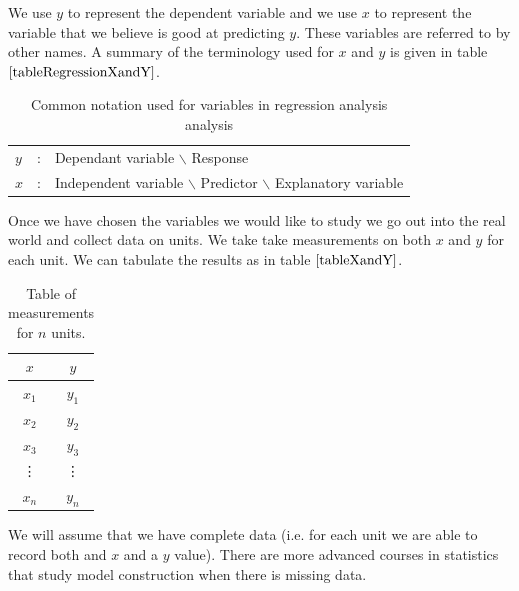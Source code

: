 We use $y$ to represent the dependent variable and we use
$x$ to represent the variable that we believe is good at predicting $y$.
These variables are referred to by other names.
A summary of the terminology used for $x$ and $y$ is given
in table $\ref{tableRegressionXandY}$.

\begin{table}[H]
\label{tableRegressionXandY}
\large
\begin{center}
	\begin{tabular}{l c l}
	$y$	& : &	Dependant variable $\backslash$ Response \\
	$x$	& : &	Independent variable $\backslash$  Predictor $\backslash$ Explanatory variable %
	\end{tabular}
\end{center}
\vspace*{-0.25cm}
\caption{Common notation used for variables in regression analysis analysis}
\end{table}
\hfill

Once we have chosen the variables we would like to study we go out into the 
real world and collect data on units.
We take take measurements on both $x$ and $y$
for each unit.
We can tabulate the results as in table $\ref{tableXandY}$.


\begin{table}[H]
\label{tableXandY}
\large
\begin{center}
\begin{tabular}{c | c }
~$x$~	&	~$y$~		\\
\hline
$x_{1}$	&	$y_{1}$	\\
$x_{2}$	&	$y_{2}$	\\
$x_{3}$	&	$y_{3}$	\\
\vdots	&	\vdots	\\
$x_{n}$	&	$y_{n}$
\end{tabular}
\end{center}
\vspace{-0.25cm}
\caption{Table of measurements for $n$ units.}
\end{table}
\hfill

\begin{nt}
\label{noteCompleteData}
We will assume that we have complete data 
(i.e. for each unit we are able to record both and $x$ and a $y$ value).
There are more advanced courses in statistics that study model
construction when there is missing data.
\end{nt}

